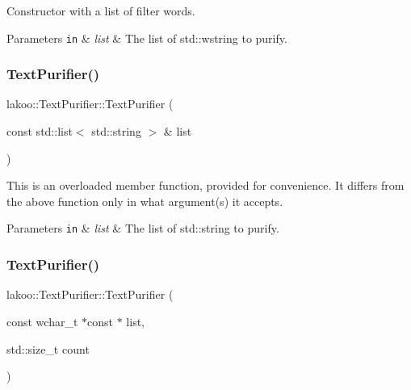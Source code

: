 Constructor with a list of filter words. 


\begin{DoxyParams}[1]{Parameters}
\mbox{\tt in}  & {\em list} & The list of std\+::wstring to purify. \\
\hline
\end{DoxyParams}
\mbox{\label{classlakoo_1_1_text_purifier_aa0788313b1f9bcc6a96a0ccf09d8c839}} 
\subsubsection{\texorpdfstring{Text\+Purifier()}{TextPurifier()}\hspace{0.1cm}{\footnotesize\ttfamily [2/4]}}
{\footnotesize\ttfamily lakoo\+::\+Text\+Purifier\+::\+Text\+Purifier (\begin{DoxyParamCaption}\item[{const std\+::list$<$ std\+::string $>$ \&}]{list }\end{DoxyParamCaption})\hspace{0.3cm}{\ttfamily [explicit]}}

This is an overloaded member function, provided for convenience. It differs from the above function only in what argument(s) it accepts. 
\begin{DoxyParams}[1]{Parameters}
\mbox{\tt in}  & {\em list} & The list of std\+::string to purify. \\
\hline
\end{DoxyParams}
\mbox{\label{classlakoo_1_1_text_purifier_a99488dd2cead65fb7d4f8de98ec41a27}} 
\subsubsection{\texorpdfstring{Text\+Purifier()}{TextPurifier()}\hspace{0.1cm}{\footnotesize\ttfamily [3/4]}}
{\footnotesize\ttfamily lakoo\+::\+Text\+Purifier\+::\+Text\+Purifier (\begin{DoxyParamCaption}\item[{const wchar\+\_\+t $\ast$const $\ast$}]{list,  }\item[{std\+::size\+\_\+t}]{count }\end{DoxyParamCaption})\hspace{0.3cm}{\ttfamily [explicit]}}

